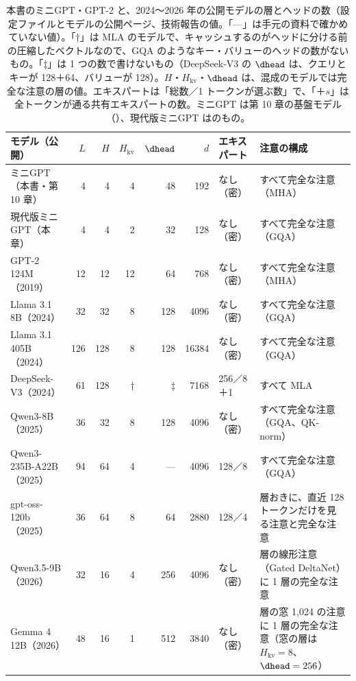 \begin{table}[tbp]
\centering
\caption{本書のミニGPT・GPT-2 と、2024〜2026 年の公開モデルの層とヘッドの数（設定ファイルとモデルの公開ページ、技術報告の値\cite{dubey2024llama3,yang2025qwen3,liu2024deepseekv3}。「—」は手元の資料で確かめていない値）。「†」は MLA のモデルで、キャッシュするのがヘッドに分ける前の圧縮したベクトルなので、GQA のようなキー・バリューのヘッドの数がないもの。「‡」は 1 つの数で書けないもの（DeepSeek-V3 の $\dhead$ は、クエリとキーが 128＋64、バリューが 128）。$H$・$H_{\mathrm{kv}}$・$\dhead$ は、混成のモデルでは完全な注意の層の値。エキスパートは「総数／1 トークンが選ぶ数」で、「＋$s$」は全トークンが通る共有エキスパートの数。ミニGPT は第 10 章の基盤モデル（）、現代版ミニGPT はのもの。}
\label{tab:ma-heads}
\scriptsize
\setlength{\tabcolsep}{2pt}
\begin{tabular}{@{}lrrrrrl>{\raggedright\arraybackslash}p{44mm}@{}}
\toprule
モデル（公開） & $L$ & $H$ & $H_{\mathrm{kv}}$ & $\dhead$ & $d$ & エキスパート & 注意の構成 \\
\midrule
ミニGPT（本書・第 10 章） & 4 & 4 & 4 & 48 & 192 & なし（密） & すべて完全な注意（MHA） \\
現代版ミニGPT（本章） & 4 & 4 & 2 & 32 & 128 & なし（密） & すべて完全な注意（GQA） \\
GPT-2 124M（2019） & 12 & 12 & 12 & 64 & 768 & なし（密） & すべて完全な注意（MHA） \\
\midrule
Llama 3.1 8B（2024） & 32 & 32 & 8 & 128 & 4096 & なし（密） & すべて完全な注意（GQA） \\
Llama 3.1 405B（2024） & 126 & 128 & 8 & 128 & 16384 & なし（密） & すべて完全な注意（GQA） \\
DeepSeek-V3（2024） & 61 & 128 & † & ‡ & 7168 & 256／8＋1 & すべて MLA \\
Qwen3-8B（2025） & 36 & 32 & 8 & 128 & 4096 & なし（密） & すべて完全な注意（GQA、QK-norm） \\
Qwen3-235B-A22B（2025） & 94 & 64 & 4 & — & 4096 & 128／8 & すべて完全な注意（GQA） \\
gpt-oss-120b（2025） & 36 & 64 & 8 & 64 & 2880 & 128／4 & 1 層おきに、直近 128 トークンだけを見る注意と完全な注意 \\
\midrule
Qwen3.5-9B（2026） & 32 & 16 & 4 & 256 & 4096 & なし（密） & 3 層の線形注意（Gated DeltaNet）に 1 層の完全な注意 \\
Gemma 4 12B（2026） & 48 & 16 & 1 & 512 & 3840 & なし（密） & 5 層の窓 1,024 の注意に 1 層の完全な注意（窓の層は $H_{\mathrm{kv}}=8$、$\dhead=256$） \\

\end{tabular}
\end{table}
